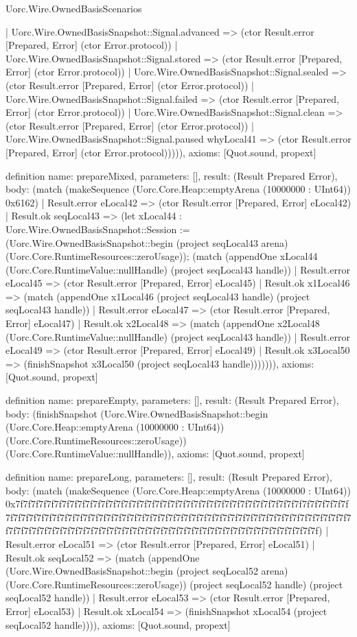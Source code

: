 \begin{lexlean}{Uorc.Wire.OwnedBasisScenarios}
\begin{semanticmodule}
{      | Uorc.Wire.OwnedBasisSnapshot::Signal.advanced => (ctor Result.error [Prepared, Error] (ctor Error.protocol))
      | Uorc.Wire.OwnedBasisSnapshot::Signal.stored => (ctor Result.error [Prepared, Error] (ctor Error.protocol))
      | Uorc.Wire.OwnedBasisSnapshot::Signal.sealed => (ctor Result.error [Prepared, Error] (ctor Error.protocol))
      | Uorc.Wire.OwnedBasisSnapshot::Signal.failed => (ctor Result.error [Prepared, Error] (ctor Error.protocol))
      | Uorc.Wire.OwnedBasisSnapshot::Signal.clean => (ctor Result.error [Prepared, Error] (ctor Error.protocol))
      | Uorc.Wire.OwnedBasisSnapshot::Signal.paused whyLocal41 => (ctor Result.error [Prepared, Error] (ctor Error.protocol))))),
  axioms: [Quot.sound, propext]
}

definition{
  name: prepareMixed,
  parameters: [],
  result: (Result Prepared Error),
  body: (match (makeSequence (Uorc.Core.Heap::emptyArena (10000000 : UInt64)) 0x6162)
    | Result.error eLocal42 => (ctor Result.error [Prepared, Error] eLocal42)
    | Result.ok seqLocal43 => (let xLocal44 : Uorc.Wire.OwnedBasisSnapshot::Session := (Uorc.Wire.OwnedBasisSnapshot::begin (project seqLocal43 arena) (Uorc.Core.RuntimeResources::zeroUsage)); (match (appendOne xLocal44 (Uorc.Core.RuntimeValue::nullHandle) (project seqLocal43 handle))
      | Result.error eLocal45 => (ctor Result.error [Prepared, Error] eLocal45)
      | Result.ok x1Local46 => (match (appendOne x1Local46 (project seqLocal43 handle) (project seqLocal43 handle))
        | Result.error eLocal47 => (ctor Result.error [Prepared, Error] eLocal47)
        | Result.ok x2Local48 => (match (appendOne x2Local48 (Uorc.Core.RuntimeValue::nullHandle) (project seqLocal43 handle))
          | Result.error eLocal49 => (ctor Result.error [Prepared, Error] eLocal49)
          | Result.ok x3Local50 => (finishSnapshot x3Local50 (project seqLocal43 handle))))))),
  axioms: [Quot.sound, propext]
}

definition{
  name: prepareEmpty,
  parameters: [],
  result: (Result Prepared Error),
  body: (finishSnapshot (Uorc.Wire.OwnedBasisSnapshot::begin (Uorc.Core.Heap::emptyArena (10000000 : UInt64)) (Uorc.Core.RuntimeResources::zeroUsage)) (Uorc.Core.RuntimeValue::nullHandle)),
  axioms: [Quot.sound, propext]
}

definition{
  name: prepareLong,
  parameters: [],
  result: (Result Prepared Error),
  body: (match (makeSequence (Uorc.Core.Heap::emptyArena (10000000 : UInt64)) 0x7f7f7f7f7f7f7f7f7f7f7f7f7f7f7f7f7f7f7f7f7f7f7f7f7f7f7f7f7f7f7f7f7f7f7f7f7f7f7f7f7f7f7f7f7f7f7f7f7f7f7f7f7f7f7f7f7f7f7f7f7f7f7f7f7f7f7f7f7f7f7f7f7f7f7f7f7f7f7f7f7f7f7f7f7f7f7f7f7f7f7f7f7f7f7f7f7f7f7f7f7f7f7f7f7f7f7f7f7f7f7f7f7f7f7f7f7f7f7f7f7f7f7f7f7f7f7f7f)
    | Result.error eLocal51 => (ctor Result.error [Prepared, Error] eLocal51)
    | Result.ok seqLocal52 => (match (appendOne (Uorc.Wire.OwnedBasisSnapshot::begin (project seqLocal52 arena) (Uorc.Core.RuntimeResources::zeroUsage)) (project seqLocal52 handle) (project seqLocal52 handle))
      | Result.error eLocal53 => (ctor Result.error [Prepared, Error] eLocal53)
      | Result.ok xLocal54 => (finishSnapshot xLocal54 (project seqLocal52 handle)))),
  axioms: [Quot.sound, propext]
}


\end{semanticmodule}
\end{lexlean}
